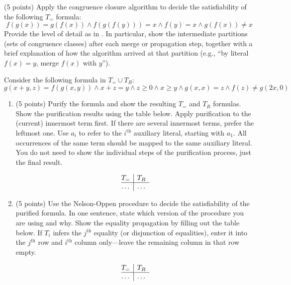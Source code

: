 \documentclass{handout}
\begin{document}
\begin{questions}
\item (5 points) \label{prob:smt:first} Apply the congruence closure algorithm
to decide the satisfiability of the following $T_=$ formula:
\[
f(g(x)) = g(f(x)) \wedge f(g(f(y))) = x \wedge f(y) = x \wedge g(f(x)) \neq x
\]
Provide the level of detail as in .  In particular, show the
intermediate partitions (sets of congruence classes) after each merge or
propagation step, together with a brief explanation of how the algorithm arrived
at that partition (e.g., ``by literal $f(x) = y$, merge $f(x)$ with $y$'').
\label{prob:first}




\item Consider the following formula in $T_=\cup T_R$: 
\[
g(x + y, z) = f(g(x, y)) \wedge x + z = y \wedge z \geq 0 \wedge x \geq y \wedge g(x, x) = z \wedge f(z) \neq g(2x, 0)
\]

\begin{enumerate}
\item (5 points) Purify the formula and show the resulting $T_=$ and $T_R$
formulas. Show the purification results using the table below. Apply
purification to the (current) innermost term first.  If there are several
innermost terms, prefer the leftmost one.  Use $a_i$ to refer to the
$i^\text{th}$ auxiliary literal, starting with $a_1$.  All occurrences of the
same term should be mapped to the same auxiliary literal. You do not need to
show the individual steps of the purification process, just the final result.

\[
\begin{array}{@{}l|l}
T_=           & T_R\\ \hline
\ldots & \ldots \\
\end{array}
\]



\item (5 points) Use the Nelson-Oppen procedure to decide the satisfiability of
the purified formula.  In one sentence, state which version of the procedure you
are using and why.  Show the equality propagation  by filling out the table
below.  If $T_i$ infers the $j^\text{th}$ equality (or disjunction of
equalities), enter it into the $j^\text{th}$ row and $i^\text{th}$ column
only---leave the remaining column in that row empty.

\[
\begin{array}{@{}l|l}
T_= & T_R\\ \hline
\ldots & \ldots \\
\end{array}
\]



\end{enumerate}
\end{questions}
\end{document}
